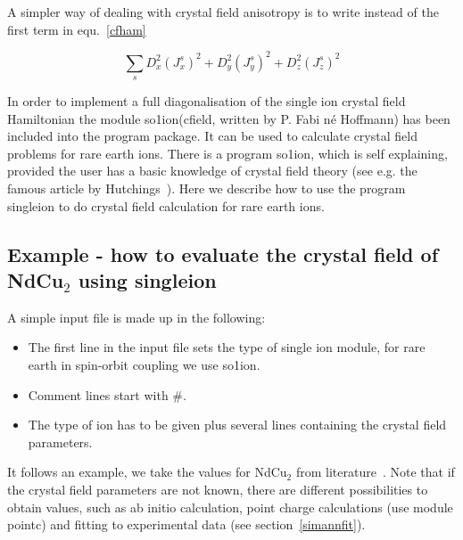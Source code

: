 A simpler way of dealing with crystal field anisotropy is to write
instead of the first term in equ.~\ref{cfham}

\begin{equation}
  \sum_s D_x^2 (J_x^s)^2 + D_y^2 (J_y^s)^2 +D_z^2 (J_z^s)^2 
\end{equation}

In order to implement a full diagonalisation of the single ion crystal field Hamiltonian
the module {\prg so1ion}({\prg cfield}, written by P. Fabi n\'e Hoffmann) has %
been included into the program package. It  can be used  to 
calculate crystal field problems for rare earth ions. There is a program 
{\prg so1ion}, which is self explaining, provided 
the user has a basic knowledge of crystal field 
theory (see e.g. the famous article by Hutchings~\cite{hutchings64-227}).
Here we describe how to use the program {\prg singleion} to do crystal field calculation
for rare earth ions. 

\subsection{Example - how to evaluate the crystal field of NdCu$_2$ using
 {\prg singleion}}\label{cfieldexample}


A simple input file is made up in the following:

\begin{itemize}
\item The first line in the input file sets the type of single ion module, for rare earth in spin-orbit
    coupling we use {\prg so1ion}.
\item Comment lines start with \#. 
\item The type of ion has to be given plus
several lines containing the crystal field parameters. 
\end{itemize}

It follows an example, we take the values
for NdCu$_2$ from literature~\cite{gratz91-9297}. Note that
if the crystal field parameters are not known, there are different
possibilities to obtain values, such as ab initio calculation,
point charge calculations (use module {\prg pointc}) and fitting
to experimental data (see section~\ref{simannfit}).

